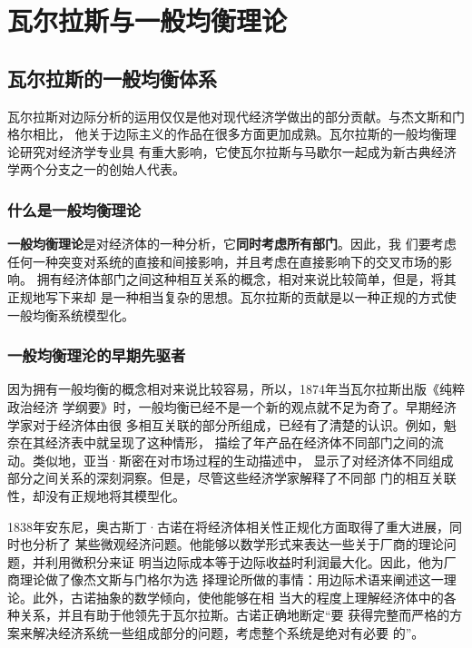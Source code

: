 \chapter{瓦尔拉斯与一般均衡理论}

\section{瓦尔拉斯的一般均衡体系}

瓦尔拉斯对边际分析的运用仅仅是他对现代经济学做出的部分贡献。与杰文斯和门格尔相比，
他关于边际主义的作品在很多方面更加成熟。瓦尔拉斯的一般均衡理论研究对经济学专业具
有重大影响，它使瓦尔拉斯与马歇尔一起成为新古典经济学两个分支之一的创始人代表。

\subsection{什么是一般均衡理论}

\textbf{一般均衡理论}是对经济体的一种分析，它\textbf{同时考虑所有部门}。因此，我
们要考虑任何一种突变对系统的直接和间接影响，并且考虑在直接影响下的交叉市场的影响。
拥有经济体部门之间这种相互关系的概念，相对来说比较简单，但是，将其正规地写下来却
是一种相当复杂的思想。瓦尔拉斯的贡献是以一种正规的方式使一般均衡系统模型化。

\subsection{一般均衡理沦的早期先驱者}

因为拥有一般均衡的概念相对来说比较容易，所以，1874年当瓦尔拉斯出版《纯粹政治经济
学纲要》时，一般均衡已经不是一个新的观点就不足为奇了。早期经济学家对于经济体由很
多相互关联的部分所组成，已经有了清楚的认识。例如，魁奈在其经济表中就呈现了这种情形，
描绘了年产品在经济体不同部门之间的流动。类似地，亚当·斯密在对市场过程的生动描述中，
显示了对经济体不同组成部分之间关系的深刻洞察。但是，尽管这些经济学家解释了不同部
门的相互关联性，却没有正规地将其模型化。

1838年安东尼，奥古斯丁·古诺在将经济体相关性正规化方面取得了重大进展，同时也分析了
某些微观经济问题。他能够以数学形式来表达一些关于厂商的理论问题，并利用微积分来证
明当边际成本等于边际收益时利润最大化。因此，他为厂商理论做了像杰文斯与门格尔为选
择理论所做的事情：用边际术语来阐述这一理论。此外，古诺抽象的数学倾向，使他能够在相
当大的程度上理解经济体中的各种关系，并且有助于他领先于瓦尔拉斯。古诺正确地断定“要
获得完整而严格的方案来解决经济系统一些组成部分的问题，考虑整个系统是绝对有必要
的”。

